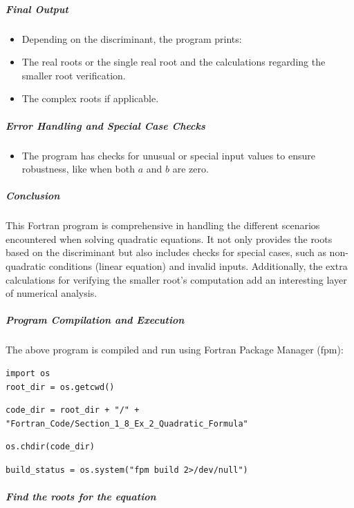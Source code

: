 \subparagraph{Final Output}

\begin{itemize}
\item Depending on the discriminant, the program prints:
\item The real roots or the single real root and the calculations regarding the smaller root verification.
\item The complex roots if applicable.
\end{itemize}

\subparagraph{Error Handling and Special Case Checks}

\begin{itemize}
\item The program has checks for unusual or special input values to ensure robustness, like when both $a$ and $b$ are zero.
\end{itemize}

\subparagraph{Conclusion}

This Fortran program is comprehensive in handling the different scenarios encountered when solving quadratic equations. It not only provides the roots based on the discriminant but also includes checks for special cases, such as non-quadratic conditions (linear equation) and invalid inputs. Additionally, the extra calculations for verifying the smaller root's computation add an interesting layer of numerical analysis.

\subparagraph{Program Compilation and Execution}

The above program is compiled and run using Fortran Package Manager (fpm):

\begin{verbatim}
import os
root_dir = os.getcwd()
\end{verbatim}

\begin{verbatim}
code_dir = root_dir + "/" + "Fortran_Code/Section_1_8_Ex_2_Quadratic_Formula"
\end{verbatim}

\begin{verbatim}
os.chdir(code_dir)
\end{verbatim}

\begin{verbatim}
build_status = os.system("fpm build 2>/dev/null")
\end{verbatim}

\subparagraph{Find the roots for the equation \newline
}

